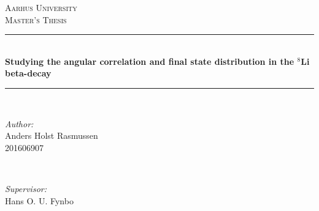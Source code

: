 \documentclass[12pt]{article}
\begin{document}
\begin{titlepage}

\newcommand{\HRule}{\rule{\linewidth}{0.5mm}} %

\center %
 

\textsc{\LARGE Aarhus University}\\[1.5cm] %
\textsc{\Large Master's Thesis}\\[0.5cm] %



\HRule \\[0.4cm]
{ \Large \bfseries Studying the angular correlation and final state distribution in the $^8$Li beta-decay}\\[0.4cm] %
\HRule \\[1.5cm]
 

\begin{minipage}{0.4\textwidth}
\begin{flushleft} \large
\emph{Author:}\\
Anders Holst Rasmussen\\
201606907
\end{flushleft}
\end{minipage}
~
\begin{minipage}{0.4\textwidth}
\begin{flushright} \large
\emph{Supervisor:} \\
Hans O. U. Fynbo %
\end{flushright}
\end{minipage}\\[2cm]



\end{titlepage}
\end{document}
